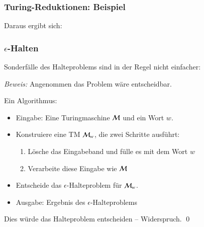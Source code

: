 \documentclass[onlymath]{beamer}
\begin{document}
\begin{frame}\frametitle{Turing-Reduktionen: Beispiel}

\bigskip\pause

Daraus ergibt sich:\medskip


\end{frame}

\begin{frame}\frametitle{$\epsilon$-Halten}

Sonderfälle des Halteproblems sind in der Regel nicht einfacher:\medskip

\medskip\pause

\pause

\emph{Beweis:} Angenommen das Problem wäre entscheidbar.\medskip

Ein Algorithmus:
\begin{itemize}
\item Eingabe: Eine Turingmaschine $\mathcal{M}$ und ein Wort $w$.
\item Konstruiere eine TM $\mathcal{M}_w$, die zwei Schritte ausführt:
	\begin{enumerate}[(1)]
	\item Lösche das Eingabeband und fülle es mit dem Wort $w$
	\item Verarbeite diese Eingabe wie $\mathcal{M}$ 
	\end{enumerate}
\item Entscheide das $\epsilon$-Halteproblem für $\mathcal{M}_w$.
\item Ausgabe: Ergebnis des $\epsilon$-Halteproblems
\end{itemize}\pause

Dies würde das Halteproblem entscheiden -- Widerspruch. \qed

\end{frame}
\end{document}

